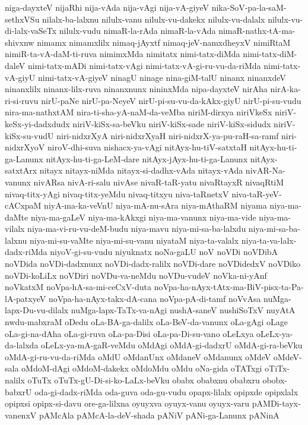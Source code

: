 {niga-dayxteV
nijaRhi
nija-vAda
nija-vAgi
nija-vA-giyeV
nika-SoV-pa-la-saM-sethxVSu
nilalx-ba-lalxnu
nilulx-vanu
nilulx-vu-dakekx
nilulx-vu-dalalx
nilulx-vu-di-lalx-vaSeTx
nilulx-vudu
nimaR-la-rAda
nimaR-la-vAda
nimaR-nathx-tA-ma-shivxnw
nimamx
nimamxlilx
nimaq-jAyxtf
nimaq-jeV-namxdheyxV
nimiRtaM
nimiR-ta-vA-daM-ti-ruva
nimimxMda
nimitatx
nimi-tatx-diMda
nimi-tatx-diM-daleV
nimi-tatx-mADi
nimi-tatx-vAgi
nimi-tatx-vA-gi-ru-vu-da-riMda
nimi-tatx-vA-giyU
nimi-tatx-vA-giyeV
ninagU
ninage
nina-giM-talU
ninanx
ninanxdeV
ninanxlilx
ninanx-lilx-ruva
ninanxnunx
nininxMda
nipa-dayxteV
nirAha
nirA-ka-ri-si-ruvu
nirU-paNe
nirU-pa-NeyeV
nirU-pi-su-vu-da-kAkx-giyU
nirU-pi-su-vudu
nira-ma-nathxtAM
nira-ti-sha-yA-naM-da-veMba
niriM-dirxya
niriVkeSx
niriV-keSx-yi-dadxdudx
niriV-kiSx-sa-beVku
niriV-kiSx-sade
niriV-kiSx-sidudx
niriV-kiSx-su-vudU
niri-nidxrXyA
niri-nidxrXyaH
niri-nidxrX-ya-pu-raH-sa-ramf
niri-nidxrXyoV
niroV-dhi-suva
nishacx-ya-vAgi
nitAyx-hu-tiV-satxtaH
nitAyx-hu-ti-ga-Lanunx
nitAyx-hu-ti-ga-LeM-dare
nitAyx-jAyx-hu-ti-ga-Lanunx
nitAyx-satxtArx
nitayx
nitayx-niMda
nitayx-si-dadhx-vAda
nitayx-vAda
nivAR-Na-vanunx
nivARsa
nivA-ri-salu
nivAse
nivaR-taR-yatu
nivaRtayxR
nivaqRtiM
nivaq-titx-yAgi
nivaq-titx-yeMdu
nivaq-titxyu
niva-taRnetxV
niva-taR-yeV-cACxpaM
niyA-ma-ka-veVnU
niya-mA-nu-sAra
niya-mAthaRM
niyama
niya-ma-daMte
niya-ma-gaLeV
niya-ma-kAkxgi
niya-ma-vanunx
niya-ma-vide
niya-ma-vilalx
niya-ma-vi-ru-vu-deM-budu
niya-mavu
niya-mi-sa-ba-lalxdu
niya-mi-sa-ba-lalxnu
niya-mi-su-vaMte
niya-mi-su-vanu
niyataM
niya-ta-valalx
niya-ta-va-lalx-dadx-riMda
niyoV-gi-su-vudu
niyuknatx
noNa-gaLU
noV
noVDi
noVDibA
noVDida
noVDi-dadxnunx
noVDi-dadx-ralilx
noVDi-dare
noVDidedxV
noVDiko
noVDi-koLiLx
noVDiri
noVDu-va-neMdu
noVDu-vudeV
noVka-ni-yAnf
noVkatxM
noVpa-hA-sa-mi-ceCxV-duta
noVpa-ha-nAyx-tAtx-ma-BiV-pisx-ta-Pa-lA-patxyeV
noVpa-ha-nAyx-takx-dA-cana
noVpa-pA-di-tamf
noVvAsa
nuMga-lapx-Du-vu-dilalx
nuMga-lapx-TaTx-va-nAgi
nushA-saneV
nushiSoTxV
nuyAtA
nwdu-mabxraM
oDedu
oLa-BA-ga-dalilx
oLa-BeV-da-vanunx
oLa-gAgi
oLage
oLa-gi-na-dAha
oLa-gi-ruva
oLa-pa-Disi
oLa-pa-Di-su-vano
oLeLxya
oLeLx-ya-da-lalxda
oLeLx-ya-mA-gaR-veMdu
oMdAgi
oMdA-gi-dadxrU
oMdA-gi-ra-beVku
oMdA-gi-ru-vu-da-riMda
oMdU
oMdanUnx
oMdaneV
oMdanunx
oMdeV
oMdeV-sala
oMdoM-dAgi
oMdoM-dakekx
oMdoMdu
oMdu
oNa-gida
oTATxgi
oTiTx-nalilx
oTuTx
oTuTx-gU-Di-si-ko-LaLx-beVku
obabx
obabxnu
obabxru
obobx-babxrU
oda-gi-dadx-riMda
oda-guva
oda-gu-vudu
opapx-lilalx
opipxde
opipxlalx
opipxsi
opipx-si-davu
ore-ga-lilxna
oyuyxva
oyuyx-vanu
oyuyx-varu
pAMDi-tayx-vanenxV
pAMcAla
pAMcA-la-deV-shada
pANiV
pANi-ga-Lanunx
pANinA
}
